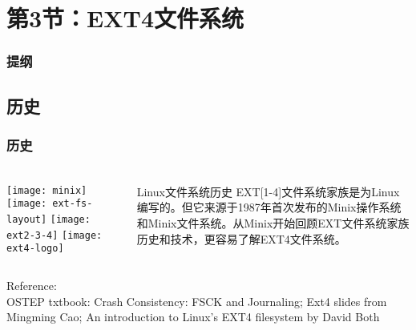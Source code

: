 \section{第3节：EXT4文件系统} %
\begin{frame}
\frametitle{提纲} %
\tableofcontents %
\end{frame}
\subsection{历史}
\begin{frame}[plain]
    \frametitle{历史}

	\frametitle{ }
	\begin{columns}
		\begin{column}{.45\textwidth}
	    \texttt{[image: minix]}
	    \texttt{[image: ext-fs-layout]}
	    \texttt{[image: ext2-3-4]}
		\texttt{[image: ext4-logo]}	
			
		\end{column}
		
		\begin{column}{.5\textwidth}
		  	\begin{block}{Linux文件系统历史}
		  	EXT[1-4]文件系统家族是为Linux编写的。但它来源于1987年首次发布的Minix操作系统和Minix文件系统。从Minix开始回顾EXT文件系统家族历史和技术，更容易了解EXT4文件系统。
		  \end{block}

		\end{column}
	\end{columns}
\tiny Reference: \\
OSTEP txtbook: Crash Consistency: FSCK and Journaling; Ext4 slides from Mingming Cao; An introduction to Linux's EXT4 filesystem by  David Both

\end{frame}




